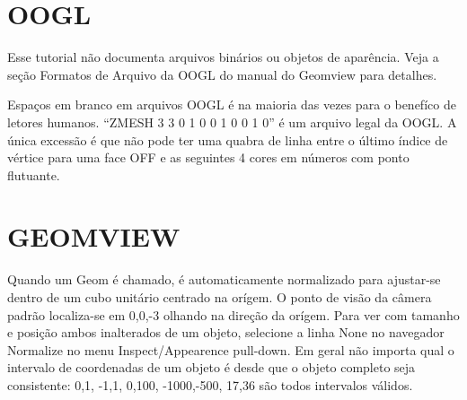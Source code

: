 \documentclass[12pt,a4paper]{book}
\begin{document}
\section{OOGL}

Esse tutorial não documenta arquivos binários ou objetos de aparência.
Veja a seção Formatos de Arquivo da OOGL do manual do Geomview para detalhes. 

Espaços em branco em arquivos OOGL é na maioria das vezes para o benefíco de letores humanos.
``ZMESH 3 3 0 1 0 0 1 0 0 1 0'' é um arquivo legal da OOGL.  A única
excessão é que não pode ter uma quabra de linha entre o último índice de
vértice para uma face OFF e as seguintes 4 cores em números com ponto flutuante.

\section{GEOMVIEW}

Quando um Geom é chamado, é automaticamente normalizado para ajustar-se dentro de um
cubo unitário centrado na orígem. O ponto de visão da câmera padrão localiza-se em
{0,0,-3} olhando na direção da orígem. Para ver com tamanho e posição
ambos inalterados de um objeto, selecione a linha None no navegador Normalize
no menu Inspect/Appearence pull-down. Em geral não importa qual o intervalo de
coordenadas de um objeto é desde que o objeto completo seja consistente: {0,1},
{-1,1}, {0,100}, {-1000,-500}, {17,36} são todos intervalos válidos.
\end{document}
